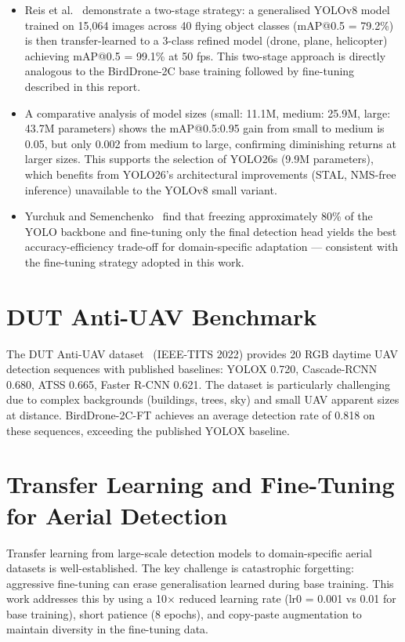 \documentclass[12pt,a4paper]{report}
\begin{document}
\begin{itemize}
  \item Reis et al.~\cite{reis2024yolov8} demonstrate a two-stage strategy: a generalised YOLOv8
        model trained on 15,064 images across 40 flying object classes (mAP@0.5 = 79.2\%) is then
        transfer-learned to a 3-class refined model (drone, plane, helicopter) achieving
        mAP@0.5 = 99.1\% at 50 fps. This two-stage approach is directly analogous to the
        BirdDrone-2C base training followed by fine-tuning described in this report.
  \item A comparative analysis of model sizes (small: 11.1M, medium: 25.9M, large: 43.7M parameters)
        shows the mAP@0.5:0.95 gain from small to medium is 0.05, but only 0.002 from medium to large,
        confirming diminishing returns at larger sizes. This supports the selection of YOLO26s (9.9M
        parameters), which benefits from YOLO26's architectural improvements (STAL, NMS-free inference)
        unavailable to the YOLOv8 small variant.
  \item Yurchuk and Semenchenko~\cite{yurchuk2024edge} find that freezing approximately 80\% of the
        YOLO backbone and fine-tuning only the final detection head yields the best accuracy-efficiency
        trade-off for domain-specific adaptation --- consistent with the fine-tuning strategy adopted
        in this work.
\end{itemize}

\section{DUT Anti-UAV Benchmark}

The DUT Anti-UAV dataset~\cite{dutantiuav2022} (IEEE-TITS 2022) provides
20 RGB daytime UAV detection sequences with published baselines:
YOLOX 0.720, Cascade-RCNN 0.680, ATSS 0.665, Faster R-CNN 0.621.
The dataset is particularly challenging due to complex backgrounds
(buildings, trees, sky) and small UAV apparent sizes at distance.
BirdDrone-2C-FT achieves an average detection rate of 0.818 on these
sequences, exceeding the published YOLOX baseline.

\section{Transfer Learning and Fine-Tuning for Aerial Detection}

Transfer learning from large-scale detection models to domain-specific
aerial datasets is well-established. The key challenge is catastrophic
forgetting: aggressive fine-tuning can erase generalisation learned during
base training. This work addresses this by using a 10$\times$ reduced
learning rate (lr0 = 0.001 vs 0.01 for base training), short patience
(8 epochs), and copy-paste augmentation to maintain diversity in the
fine-tuning data.
\end{document}
